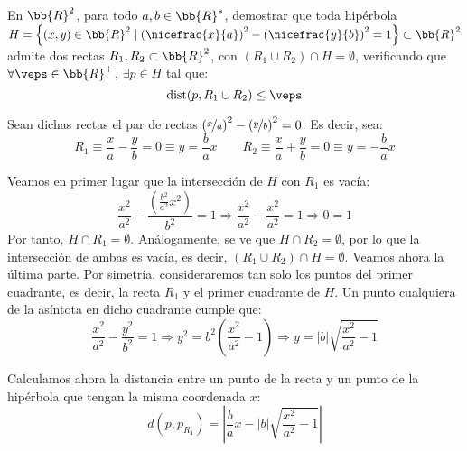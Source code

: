 \documentclass[12pt]{article}
\begin{document}
    \begin{ejercicio}[3 puntos]
        En $\bb{R}^2$, para todo $a,b\in \bb{R}^\ast$, demostrar que toda hipérbola $H=\left\{(x,y)\in \bb{R}^2\mid \left(\nicefrac{x}{a}\right)^2-\left(\nicefrac{y}{b}\right)^2=1\right\}\subset \bb{R}^2$ admite dos rectas $R_1,R_2\subset \bb{R}^2$, con $(R_1\cup R_2)\cap H=\emptyset$, verificando que $\forall \veps\in \bb{R}^+$, $\exists p\in H$ tal que:
        \begin{equation*}
            \text{dist}(p,R_1\cup R_2)\leq \veps
        \end{equation*}

        Sean dichas rectas el par de rectas $\left(\nicefrac{x}{a}\right)^2-\left(\nicefrac{y}{b}\right)^2=0$.
        Es decir, sea:
        \begin{equation*}
            R_1\equiv \frac{x}{a} - \frac{y}{b} = 0 \equiv y = \frac{b}{a}x
            \qquad R_2\equiv \frac{x}{a} + \frac{y}{b} = 0 \equiv y = -\frac{b}{a}x
        \end{equation*}

        Veamos en primer lugar que la intersección de $H$ con $R_1$ es vacía:
        \begin{equation*}
            \frac{x^2}{a^2} - \frac{\left(\frac{b^2}{a^2}x^2\right)}{b^2} = 1
            \Longrightarrow
            \frac{x^2}{a^2} - \frac{x^2}{a^2} = 1
            \Longrightarrow
            0 = 1
        \end{equation*}
        Por tanto, $H\cap R_1 = \emptyset$. Análogamente, se ve que $H\cap R_2 = \emptyset$,
        por lo que la intersección de ambas es vacía, es decir, $(R_1\cup R_2)\cap H = \emptyset$.
        Veamos ahora la última parte. Por simetría, consideraremos tan solo los puntos del primer cuadrante, es decir, la recta $R_1$ y el primer cuadrante de $H$.
        Un punto cualquiera de la asíntota en dicho cuadrante cumple que:
        \begin{equation*}
            \frac{x^2}{a^2} - \frac{y^2}{b^2} = 1 \Longrightarrow
            y^2 = b^2\left(\frac{x^2}{a^2}-1\right)
            \Longrightarrow y = |b|\sqrt{\frac{x^2}{a^2}-1}
        \end{equation*}

        Calculamos ahora la distancia entre un punto de la recta y un punto de la hipérbola que tengan la misma coordenada $x$:
        \begin{equation*}
            d(p, p_{R_1}) = \left|\frac{b}{a} x - |b|\sqrt{\frac{x^2}{a^2}-1}\right|
        \end{equation*}


\end{ejercicio}
\end{document}
